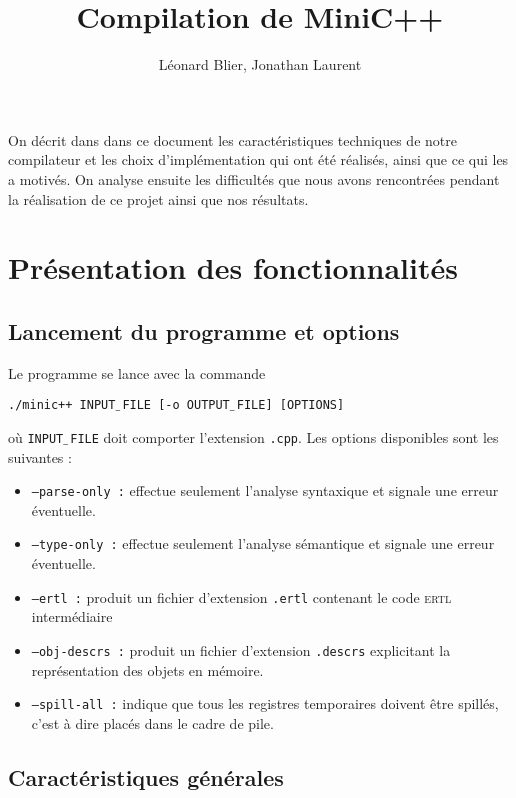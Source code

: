 \documentclass[11pt, a4paper]{article}
\newcommand{\prog}[1]{{\tt#1}}
\newcommand{\underscore}{$\_\,$}
\begin{document}
\title{Compilation de MiniC++}
\author{Léonard Blier, Jonathan Laurent}
\maketitle

On décrit dans dans ce document les caractéristiques techniques de notre compilateur et les choix d'implémentation qui ont été réalisés, ainsi que ce qui les a motivés. On analyse ensuite les difficultés que nous avons rencontrées pendant la réalisation de ce projet ainsi que nos résultats.

\section{Présentation des fonctionnalités}

\subsection{Lancement du programme et options}

Le programme se lance avec la commande 

\begin{center}\prog{./minic++ INPUT\underscore{}FILE [-o OUTPUT\underscore{}FILE] [OPTIONS] }\end{center}

où \prog{INPUT\underscore{}FILE} doit comporter l'extension \prog{.cpp}. Les options disponibles sont les suivantes :

\medskip

\begin{itemize}
\item[] \prog{--parse-only :} effectue seulement  l'analyse syntaxique et signale une erreur éventuelle.
\item[] \prog{--type-only :} effectue seulement  l'analyse sémantique et signale une erreur éventuelle.
\item[] \prog{--ertl :} produit un fichier d'extension \prog{.ertl} contenant le code \textsc{ertl} intermédiaire
\item[] \prog{--obj-descrs :} produit un fichier d'extension \prog{.descrs} explicitant la représentation des objets en mémoire.
\item[] \prog{--spill-all :} indique que tous les registres temporaires doivent être spillés, c'est à dire placés dans le cadre de pile.
\end{itemize}

\subsection{Caractéristiques générales}
\end{document}
